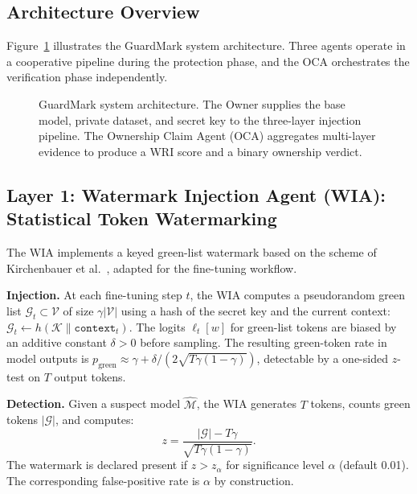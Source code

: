 \documentclass[journal,compsoc]{IEEEtran}
\newcommand{\M}{\mathcal{M}}
\newcommand{\K}{\mathcal{K}}
\newcommand{\G}{\mathcal{G}}
\begin{document}
\subsection{Architecture Overview}

Figure~\ref{fig:overview} illustrates the GuardMark system architecture.
Three agents operate in a cooperative pipeline during the protection phase,
and the OCA orchestrates the verification phase independently.

\begin{figure}[t]
\caption{GuardMark system architecture. The Owner supplies the base model,
  private dataset, and secret key to the three-layer injection pipeline.
  The Ownership Claim Agent (OCA) aggregates multi-layer evidence to produce
  a WRI score and a binary ownership verdict.}
\label{fig:overview}
\centering
\resizebox{\columnwidth}{!}{}
\end{figure}

\subsection{Layer 1: Watermark Injection Agent (WIA): Statistical Token Watermarking}

The WIA implements a keyed green-list watermark based on the scheme of
Kirchenbauer et al.~\cite{kirchenbauer2023watermark}, adapted for the
fine-tuning workflow.

\textbf{Injection.} At each fine-tuning step $t$, the WIA computes a
pseudorandom green list $\G_t \subset \mathcal{V}$ of size $\gamma|\mathcal{V}|$
using a hash of the secret key and the current context:
$\G_t \leftarrow h(\K \| \mathtt{context}_t)$. The logits $\ell_t[w]$ for
green-list tokens are biased by an additive constant $\delta > 0$ before
sampling. The resulting green-token rate in model outputs is
$p_{\text{green}} \approx \gamma + \delta / (2\sqrt{T\gamma(1-\gamma)})$,
detectable by a one-sided $z$-test on $T$ output tokens.

\textbf{Detection.} Given a suspect model $\hat{\M}$, the WIA generates $T$
tokens, counts green tokens $|\G|$, and computes:
\begin{equation}
  z = \frac{|\G| - T\gamma}{\sqrt{T\gamma(1-\gamma)}}.
  \label{eq:ztest}
\end{equation}
The watermark is declared present if $z > z_\alpha$ for significance level
$\alpha$ (default 0.01). The corresponding false-positive rate is $\alpha$ by
construction.
\end{document}
